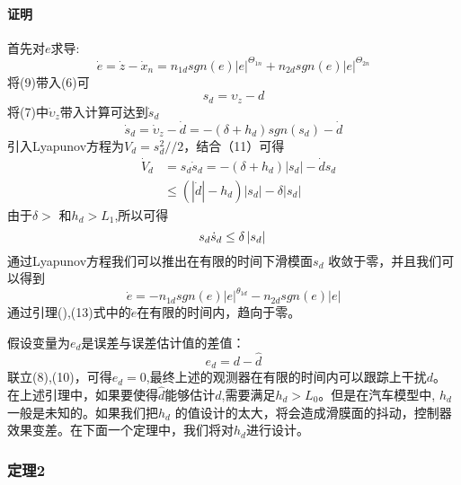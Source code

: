 \documentclass{cjc}
\begin{document}
  \paragraph*{证明}
    首先对$e$求导:
    \begin{equation}
      \dot{e} = \dot{z}-\dot{x}_n =  n_{1d} sgn(e) \left| e \right|^{\varTheta_{1n}} + n_{2d} sgn(e)\left|e\right|^{\varTheta_{2n}} 
    \end{equation}
    将(9)带入(6)可\:
    \begin{equation}
      s_d = \upsilon _z -d
    \end{equation}
    将(7)中$\dot{\upsilon }_z$带入计算可达到$\dot{s}_d$\:
    \begin{equation}
      \dot{s}_d = \dot{\upsilon }_z - \dot{d} = -(\delta + h_d)sgn(s_d) - \dot{d}
    \end{equation}
    引入Lyapunov方程为$V_d = s_d ^2 //2$，结合（11）可得\:
    \begin{eqnarray}
      &\dot{V}_d &= s_d \dot{s}_d = -(\delta + h_d)\left| s_d \right| - \dot{d}s_d \nonumber\\
      & &  \leq (\left| {\dot{d}} \right| -h_d)  \left| s_d \right| - \delta \left| s_d \right|
    \end{eqnarray}
    由于$\delta>$ 和$h_d>L_1$,所以可得\:
    \begin{equation*}
      s_d \dot{s}_d \leq \delta \left| s_d \right| \\    
    \end{equation*}
    通过Lyapunov方程我们可以推出在有限的时间下滑模面$s_d$ 收敛于零，并且我们可以得到\:
    \begin{equation}
      \dot{e} = - n_{1d}sgn(e)\left| e\right|^{\theta_{1d}} - n_{2d}sgn(e)  \left| e\right|
    \end{equation}
    通过引理(),(13)式中的$\dot{e}$在有限的时间内，趋向于零。

    假设变量为$e_d$是误差与误差估计值的差值：
    \begin{equation}
      e_d = d - \hat{d}
    \end{equation}
    联立(8),(10)，可得$e_d = 0$,最终上述的观测器在有限的时间内可以跟踪上干扰$d$。 \\
    在上述引理中，如果要使得$\hat{d}$能够估计$d$,需要满足$h_d > L_0$。但是在汽车模型中, $h_d$一般是未知的。如果我们把$h_d$
    的值设计的太大，将会造成滑膜面的抖动，控制器效果变差。在下面一个定理中，我们将对$h_d$进行设计。
    
  \subsubsection{定理2}
\end{document}
